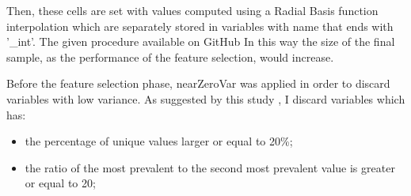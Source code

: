 \begin{figure}[H] 
    \centering
    \hfill%
    \caption{}
    \label{fig:comparison-sensors}
\end{figure}


Then, these cells are set with values computed using a Radial Basis function interpolation\cite{wright2003radial} which are separately stored in variables with name that ends with '\_int'. The given procedure available on GitHub \newline
In this way the size of the final sample, as the performance of the feature selection, would increase.
\par
Before the feature selection phase, nearZeroVar was applied in order to discard variables with low variance.
As suggested by this study\cite{kuhn2008building} , I discard variables which has: 
\begin{itemize}
    \item the percentage of unique values larger or equal to 20\%;
    \item the ratio of the most prevalent to the second most prevalent value is greater or equal to 20;
\end{itemize} 

